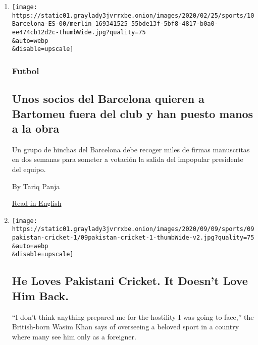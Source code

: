 \begin{enumerate}
\def\labelenumi{\arabic{enumi}.}
\item
  \href{/es/2020/09/10/espanol/deportes/barcelona-bartomeu.html}{}

  \texttt{[image: https://static01.graylady3jvrrxbe.onion/images/2020/02/25/sports/10Barcelona-ES-00/merlin\_169341525\_55bde13f-5bf8-4817-b0a0-ee474cb12d2c-thumbWide.jpg?quality=75\\\&auto=webp\\\&disable=upscale]}

  \hypertarget{futbol}{%
  \subsubsection{Futbol}\label{futbol}}

  \hypertarget{unos-socios-del-barcelona-quieren-a-bartomeu-fuera-del-club-y-han-puesto-manos-a-la-obra}{%
  \subsection{Unos socios del Barcelona quieren a Bartomeu fuera del
  club y han puesto manos a la
  obra}\label{unos-socios-del-barcelona-quieren-a-bartomeu-fuera-del-club-y-han-puesto-manos-a-la-obra}}

  Un grupo de hinchas del Barcelona debe recoger miles de firmas
  manuscritas en dos semanas para someter a votación la salida del
  impopular presidente del equipo.

  By Tariq Panja

  \href{https://www.nytimes3xbfgragh.onion/2020/09/08/sports/soccer/barcelona-bartomeu.html}{Read
  in English}
\item
  \href{/2020/09/09/sports/cricket/wasim-khan-pakistan-cricket.html}{}

  \texttt{[image: https://static01.graylady3jvrrxbe.onion/images/2020/09/09/sports/09pakistan-cricket-1/09pakistan-cricket-1-thumbWide-v2.jpg?quality=75\\\&auto=webp\\\&disable=upscale]}

  \hypertarget{he-loves-pakistani-cricket-it-doesnt-love-him-back}{%
  \subsection{He Loves Pakistani Cricket. It Doesn't Love Him
  Back.}\label{he-loves-pakistani-cricket-it-doesnt-love-him-back}}

  ``I don't think anything prepared me for the hostility I was going to
  face,'' the British-born Wasim Khan says of overseeing a beloved sport
  in a country where many see him only as a foreigner.


\end{enumerate}
